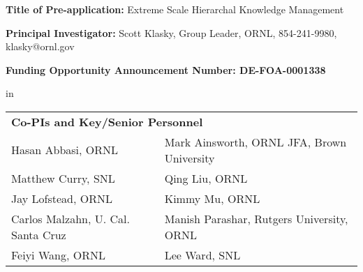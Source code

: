 \documentclass[11pt,letterpaper]{article}
\begin{document}










\setlength{\parindent}{0cm}
{\bf Title of Pre-application:}  Extreme Scale Hierarchal Knowledge Management \par
{\bf Principal Investigator:} Scott Klasky, Group Leader, ORNL, 854-241-9980, klasky@ornl.gov \par
{\bf Funding Opportunity Announcement Number: DE-FOA-0001338} \par
  in
\
\begin{tabular} {ll}
 \multicolumn{2}{l}{\bf Co-PIs and Key/Senior Personnel}\\
Hasan Abbasi, ORNL  & Mark Ainsworth, ORNL JFA, Brown University \\
Matthew Curry, SNL & Qing  Liu, ORNL \\
Jay Lofstead, ORNL & Kimmy Mu, ORNL \\
Carlos Malzahn, U. Cal. Santa Cruz & Manish Parashar, Rutgers University, ORNL \\
Feiyi Wang, ORNL & Lee Ward, SNL
\end{tabular}
\end{document}

